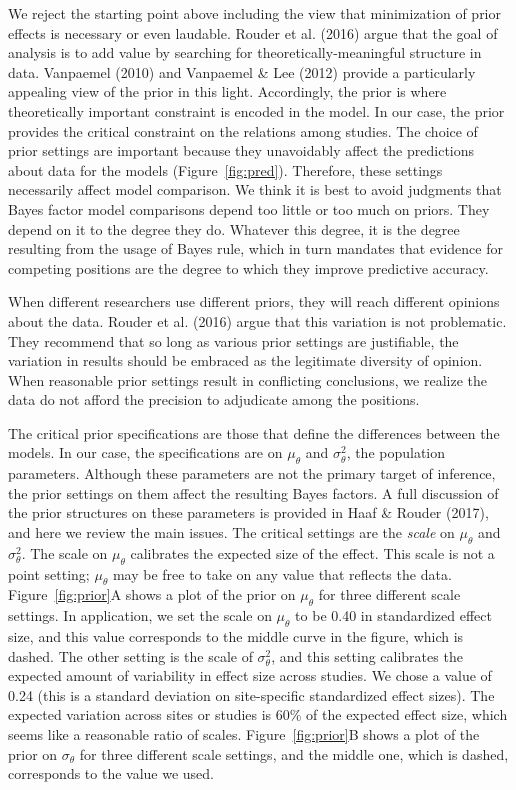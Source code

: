\documentclass[english,man]{apa6}
\theoremstyle{definition}
\theoremstyle{definition}
\theoremstyle{remark}
\begin{document}
We reject the starting point above including the view that minimization
of prior effects is necessary or even laudable. Rouder et al. (2016)
argue that the goal of analysis is to add value by searching for
theoretically-meaningful structure in data. Vanpaemel (2010) and
Vanpaemel \& Lee (2012) provide a particularly appealing view of the
prior in this light. Accordingly, the prior is where theoretically
important constraint is encoded in the model. In our case, the prior
provides the critical constraint on the relations among studies. The
choice of prior settings are important because they unavoidably affect
the predictions about data for the models (Figure~\ref{fig:pred}).
Therefore, these settings necessarily affect model comparison. We think
it is best to avoid judgments that Bayes factor model comparisons depend
too little or too much on priors. They depend on it to the degree they
do. Whatever this degree, it is the degree resulting from the usage of
Bayes rule, which in turn mandates that evidence for competing positions
are the degree to which they improve predictive accuracy.

When different researchers use different priors, they will reach
different opinions about the data. Rouder et al. (2016) argue that this
variation is not problematic. They recommend that so long as various
prior settings are justifiable, the variation in results should be
embraced as the legitimate diversity of opinion. When reasonable prior
settings result in conflicting conclusions, we realize the data do not
afford the precision to adjudicate among the positions.

The critical prior specifications are those that define the differences
between the models. In our case, the specifications are on
\(\mu_\theta\) and \(\sigma^2_\theta\), the population parameters.
Although these parameters are not the primary target of inference, the
prior settings on them affect the resulting Bayes factors. A full
discussion of the prior structures on these parameters is provided in
Haaf \& Rouder (2017), and here we review the main issues. The critical
settings are the \emph{scale} on \(\mu_\theta\) and \(\sigma^2_\theta\).
The scale on \(\mu_\theta\) calibrates the expected size of the effect.
This scale is not a point setting; \(\mu_\theta\) may be free to take on
any value that reflects the data. Figure~\ref{fig:prior}A shows a plot
of the prior on \(\mu_\theta\) for three different scale settings. In
application, we set the scale on \(\mu_\theta\) to be 0.40 in
standardized effect size, and this value corresponds to the middle curve
in the figure, which is dashed. The other setting is the scale of
\(\sigma^2_\theta\), and this setting calibrates the expected amount of
variability in effect size across studies. We chose a value of 0.24
(this is a standard deviation on site-specific standardized effect
sizes). The expected variation across sites or studies is 60\% of the
expected effect size, which seems like a reasonable ratio of scales.
Figure~\ref{fig:prior}B shows a plot of the prior on \(\sigma_\theta\)
for three different scale settings, and the middle one, which is dashed,
corresponds to the value we used.
\end{document}
